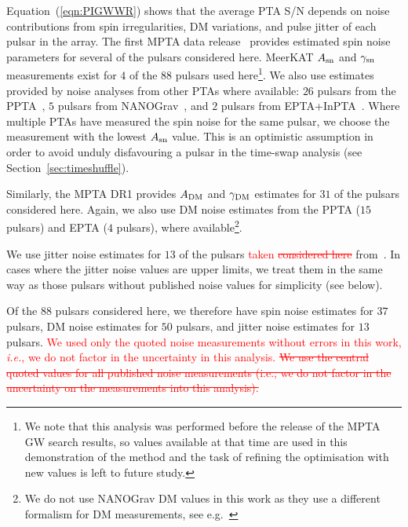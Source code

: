 \documentclass[fleqn,usenatbib]{mnras}
\newcommand{\ARed}{A_{\rm sn}}
\newcommand{\gammaRed}{\gamma_{\rm sn}}
\newcommand{\ADM}{A_{\rm DM}}
\newcommand{\gammaDM}{\gamma_{\rm DM}}
\newcommand{\NMeerTimePSRs}{88}
\newcommand{\change}{\textcolor{red}}
\begin{document}
Equation~(\ref{eqn:PIGWWR}) shows that the average PTA S/N depends on noise contributions from spin irregularities, DM variations, and pulse jitter of each pulsar in the array.
The first MPTA data release~\citep[DR1][]{MilesEtAl:2023} provides estimated spin noise  parameters for several of the pulsars considered here. 
MeerKAT $\ARed$ and $\gammaRed$ measurements exist for $4$ of the $\NMeerTimePSRs$ pulsars used here\footnote{We note that this analysis was performed before the release of the MPTA GW search results, so values available at that time are used in this demonstration of the method and the task of refining the optimisation with new values is left to future study.}. 
We also use estimates provided by noise analyses from other PTAs where available: $26$ pulsars from the PPTA~\citep{PPTANoiseReardonEtAl:2023}, $5$ pulsars from NANOGrav~\citep{NANOGravNoise:2023}, and $2$ pulsars from EPTA+InPTA~\citep{EPTANoise:2023}. 
Where multiple PTAs have measured the spin noise for the same pulsar, we choose the measurement with the lowest $A_{\rm sn}$ value. 
This is an optimistic assumption in order to avoid unduly disfavouring a pulsar in the time-swap analysis (see Section~\ref{sec:timeshuffle}).

Similarly, the MPTA DR1 provides $\ADM$ and $\gammaDM$ estimates for $31$ of the pulsars considered here. 
Again, we also use DM noise estimates from the PPTA ($15$ pulsars) and EPTA ($4$ pulsars), where available\footnote{We do not use NANOGrav DM values in this work as they use a different formalism for DM measurements, see e.g.~\cite{NANOGrav:2015}}. 

We use jitter noise estimates for $13$ of the pulsars \change{taken \st{considered here}} from~\cite{ParthasarathyEtAl:2021}.
In cases where the jitter noise values are upper limits, we treat them in the same way as those pulsars without published noise values for simplicity (see below). 

Of the $\NMeerTimePSRs$ pulsars considered here, we therefore have spin noise estimates for $37$ pulsars, DM noise estimates for $50$ pulsars, and jitter noise estimates for $13$ pulsars. 
\change{We used only the quoted noise measurements without errors in this work, \emph{i.e.}, we do not factor in the uncertainty in this analysis.}
\change{\st{We use the central quoted values for all published noise measurements (i.e., we do not factor in the uncertainty on the measurements into this analysis).}}
\end{document}
